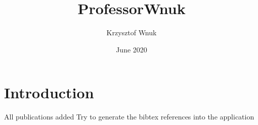 \documentclass{article}
\title{ProfessorWnuk}
\author{Krzysztof Wnuk}
\date{June 2020}
\begin{document}
\maketitle

\section{Introduction}

All publications added
Try to generate the bibtex references into the application 
\nocite{*}
\end{document}
